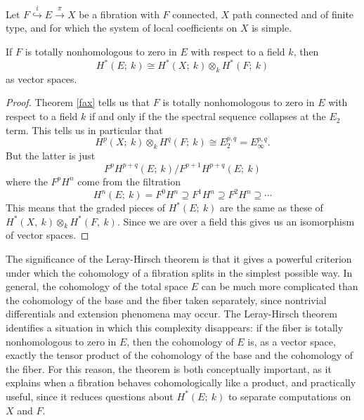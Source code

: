 \documentclass[11pt]{amsart}
\begin{document}
\begin{corollary}
    Let $F\overset{i}{\hookrightarrow} E \overset{\pi}{\longrightarrow}X$ be a fibration with $F$ connected, $X$ path connected and of finite type, and for which the system of local coefficients on $X$ is simple.

    If $F$ is totally nonhomologous to zero in $E$ with respect to a field $k$, then
    \begin{equation*}
        H^*(E;\ k) \cong H^*(X;\ k) \otimes_k H^*(F;\ k)
    \end{equation*}
    as vector spaces.
\end{corollary}
\begin{proof}
Theorem \ref{fax} tells us that $F$ is totally nonhomologous to zero in $E$ with respect to a field $k$ if and only if the the spectral sequence collapses at the $E_2$ term.   This tells us in particular that
\begin{equation*}
 H^p(X;\ k)\otimes_k H^q(F;\ k)\cong E_2^{p,q}=  E^{p,q}_\infty.
\end{equation*}
But the latter is just 
\begin{equation*}
    F^pH^{p+q}(E;\ k) / F^{p+1}H^{p+q}(E;\ k)
\end{equation*}
where the $F^pH^n$ come from the filtration
\begin{equation*}
    H^n(E;\ k)=F^0H^n \supseteq F^1H^n \supseteq F^2H^n \supseteq \cdots
\end{equation*}
This means that the graded pieces of $H^*(E;\ k)$ are the same as these of $H^*(X, \ k) \otimes_k H^*(F,\ k)$. Since we are over a field this gives us an isomorphism of vector spaces.

\end{proof}

The significance of the Leray-Hirsch theorem is that it gives a powerful criterion under which the cohomology of a fibration splits in the simplest possible way. In general, the cohomology of the total space $E$ can be much more complicated than the cohomology of the base and the fiber taken separately, since nontrivial differentials and extension phenomena may occur. The Leray-Hirsch theorem identifies a situation in which this complexity disappears: if the fiber is totally nonhomologous to zero in $E$, then the cohomology of $E$ is, as a vector space, exactly the tensor product of the cohomology of the base and the cohomology of the fiber. For this reason, the theorem is both conceptually important, as it explains when a fibration behaves cohomologically like a product, and practically useful, since it reduces questions about $H^*(E; \ k)$ to separate computations on $X$ and $F$.
\end{document}
